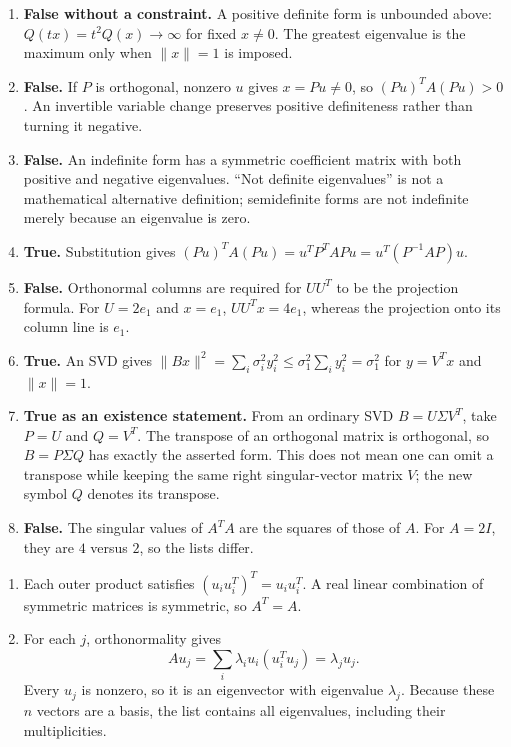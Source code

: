 \begin{enumerate}[label=(\alph*)]
the largest diagonal entry is $1$, but the unit vector $(1,1)^T/\sqrt2$
gives $x^TAx=2$, the largest eigenvalue.
\item \textbf{False without a constraint.} A positive definite form
is unbounded above: $Q(tx)=t^2Q(x)\to\infty$ for fixed $x\ne0$.
The greatest eigenvalue is the maximum only when $\|x\|=1$ is imposed.
\item \textbf{False.} If $P$ is orthogonal, nonzero $u$ gives
$x=Pu\ne0$, so $(Pu)^TA(Pu)>0$. An invertible variable change preserves
positive definiteness rather than turning it negative.
\item \textbf{False.} An indefinite form has a symmetric coefficient
matrix with both positive and negative eigenvalues. ``Not definite
 eigenvalues'' is not a mathematical alternative definition; semidefinite
forms are not indefinite merely because an eigenvalue is zero.
\item \textbf{True.} Substitution gives
$(Pu)^TA(Pu)=u^TP^TAPu=u^T(P^{-1}AP)u$.
\item \textbf{False.} Orthonormal columns are required for $UU^T$ to
be the projection formula. For $U=2e_1$ and $x=e_1$, $UU^Tx=4e_1$,
whereas the projection onto its column line is $e_1$.
\item \textbf{True.} An SVD gives
$\|Bx\|^2=\sum_i\sigma_i^2y_i^2\le\sigma_1^2\sum_i y_i^2=\sigma_1^2$
for $y=V^Tx$ and $\|x\|=1$.
\item \textbf{True as an existence statement.} From an ordinary SVD
$B=U\Sigma V^T$, take $P=U$ and $Q=V^T$. The transpose of an orthogonal
matrix is orthogonal, so $B=P\Sigma Q$ has exactly the asserted form.
This does not mean one can omit a transpose while keeping the same right
singular-vector matrix $V$; the new symbol $Q$ denotes its transpose.
\item \textbf{False.} The singular values of $A^TA$ are the squares
of those of $A$. For $A=2I$, they are $4$ versus $2$, so the lists differ.
\end{enumerate}

\begin{enumerate}[label=(\alph*)]
\item Each outer product satisfies $(u_iu_i^T)^T=u_iu_i^T$.
A real linear combination of symmetric matrices is symmetric, so $A^T=A$.
\item For each $j$, orthonormality gives
\[
 Au_j=\sum_i\lambda_i u_i(u_i^Tu_j)=\lambda_j u_j.
\]
Every $u_j$ is nonzero, so it is an eigenvector with eigenvalue $\lambda_j$.
Because these $n$ vectors are a basis, the list contains all eigenvalues,
including their multiplicities.
\end{enumerate}

